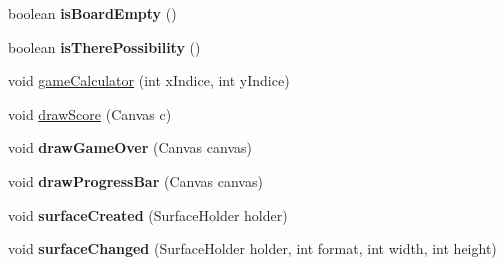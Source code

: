 \begin{DoxyCompactItemize}
\item 
boolean {\bfseries is\+Board\+Empty} ()\hypertarget{classcom_1_1initi_1_1thierry_1_1colormatchapp__v02_1_1_game_surface_a616e2611e109b6056cc4824ccf054ac3}{}\label{classcom_1_1initi_1_1thierry_1_1colormatchapp__v02_1_1_game_surface_a616e2611e109b6056cc4824ccf054ac3}

\item 
boolean {\bfseries is\+There\+Possibility} ()\hypertarget{classcom_1_1initi_1_1thierry_1_1colormatchapp__v02_1_1_game_surface_acf676d8ab2a2c34f3cc37b00abfee86a}{}\label{classcom_1_1initi_1_1thierry_1_1colormatchapp__v02_1_1_game_surface_acf676d8ab2a2c34f3cc37b00abfee86a}

\item 
void \hyperlink{classcom_1_1initi_1_1thierry_1_1colormatchapp__v02_1_1_game_surface_af3534f95e7e4bc5e9dc44920a392150e}{game\+Calculator} (int x\+Indice, int y\+Indice)
\item 
void \hyperlink{classcom_1_1initi_1_1thierry_1_1colormatchapp__v02_1_1_game_surface_a3de4bdb989882f536ea730b8a400becc}{draw\+Score} (Canvas c)
\item 
void {\bfseries draw\+Game\+Over} (Canvas canvas)\hypertarget{classcom_1_1initi_1_1thierry_1_1colormatchapp__v02_1_1_game_surface_ab32b7ae7724c4dea1c2541cf5402dc55}{}\label{classcom_1_1initi_1_1thierry_1_1colormatchapp__v02_1_1_game_surface_ab32b7ae7724c4dea1c2541cf5402dc55}

\item 
void {\bfseries draw\+Progress\+Bar} (Canvas canvas)\hypertarget{classcom_1_1initi_1_1thierry_1_1colormatchapp__v02_1_1_game_surface_acbf245e0fd7e30e373c89c89d6bb68b8}{}\label{classcom_1_1initi_1_1thierry_1_1colormatchapp__v02_1_1_game_surface_acbf245e0fd7e30e373c89c89d6bb68b8}

\item 
void {\bfseries surface\+Created} (Surface\+Holder holder)\hypertarget{classcom_1_1initi_1_1thierry_1_1colormatchapp__v02_1_1_game_surface_a76c1316607e34ad8e5ff97c621e9fdc8}{}\label{classcom_1_1initi_1_1thierry_1_1colormatchapp__v02_1_1_game_surface_a76c1316607e34ad8e5ff97c621e9fdc8}

\item 
void {\bfseries surface\+Changed} (Surface\+Holder holder, int format, int width, int height)\hypertarget{classcom_1_1initi_1_1thierry_1_1colormatchapp__v02_1_1_game_surface_ae7f2d9491b53622da295cbdc861a6c17}{}\label{classcom_1_1initi_1_1thierry_1_1colormatchapp__v02_1_1_game_surface_ae7f2d9491b53622da295cbdc861a6c17}


\end{DoxyCompactItemize}
